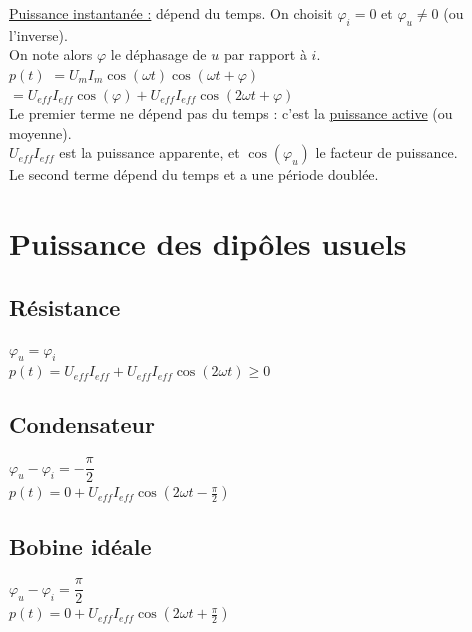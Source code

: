 \documentclass[13pt, twoside, a4paper, french]{report}
\begin{document}
    \underline{Puissance instantanée :} dépend du temps.
    On choisit $\varphi_i = 0$ et $\varphi_u \neq 0$ (ou l'inverse).\\
    On note alors $\varphi$ le déphasage de $u$ par rapport à $i$.\\

    $p(t)$ $= U_{m} I_{m} \cos(\omega t) \cos(\omega t + \varphi)$\\
    \phantom{$p(t)$ }$= U_{eff} I_{eff} \cos(\varphi) + U_{eff} I_{eff} \cos(2\omega t + \varphi)$\\

    Le premier terme ne dépend pas du temps : c'est la \underline{puissance active} (ou moyenne).\\
    $U_{eff} I_{eff}$ est la puissance apparente, et $\cos(\varphi_u)$ le facteur de puissance.\\

    Le second terme dépend du temps et a une période doublée.


    \section{Puissance des dipôles usuels}\label{sec:puissance-des-dipoles-usuels}

    \subsection{Résistance}\label{subsec:resistance}

    $\varphi_u = \varphi_i$\\
    $p(t) = U_{eff} I_{eff} + U_{eff} I_{eff} \cos(2 \omega t) \ge 0$

    \subsection{Condensateur}\label{subsec:condensateur-2}

    $\varphi_u - \varphi_i = - \dfrac{\pi}{2}$\\
    $p(t) = 0 + U_{eff} I_{eff} \cos\left(2 \omega t - \frac{\pi}{2}\right)$

    \subsection{Bobine idéale}\label{subsec:bobine-ideale}

    $\varphi_u - \varphi_i = \dfrac{\pi}{2}$\\
    $p(t) = 0 + U_{eff} I_{eff} \cos\left(2 \omega t + \frac{\pi}{2}\right)$
\end{document}
